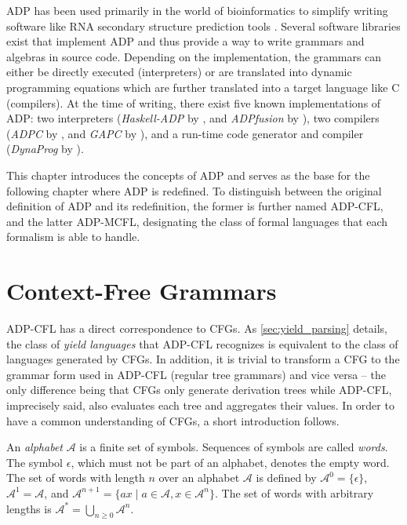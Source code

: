 \documentclass[
    a4paper,
    12pt,
    twoside,
    BCOR=12mm,
    parskip=half,
    chapterprefix,
    numbers=noenddot,
    bibliography=totoc
]{scrbook}
\begin{document}
\Gls{ADP} has been used primarily in the world of \gls{bioinformatics} to simplify writing software like \gls{RNA} secondary structure prediction tools \citep{reeder_design_2004,giegerich_abstract_2004,theis_prediction_2010}. Several software libraries exist that implement \gls{ADP} and thus provide a way to write grammars and algebras in source code. Depending on the implementation, the grammars can either be directly executed (interpreters) or are translated into dynamic programming equations which are further translated into a target language like C (compilers). At the time of writing, there exist five known implementations of \gls{ADP}: two interpreters (\emph{Haskell-ADP} by \citet{giegerich_discipline_2004}, and \emph{ADPfusion} by \citet{honer_zu_siederdissen_sneaking_2012}), two compilers (\emph{ADPC} by \citet{steffen_compiling_2006}, and \emph{GAPC} by \citet{sauthoff_bellmans_2011}), and a run-time code generator and compiler (\emph{DynaProg} by \citet{coppey_dynaprog_2012}).

This chapter introduces the concepts of \gls{ADP} and serves as the base for the following chapter where \gls{ADP} is redefined. To distinguish between the original definition of \gls{ADP} and its redefinition, the former is further named \gls{ADP-CFL}, and the latter \gls{ADP-MCFL}, designating the class of formal languages that each formalism is able to handle.

\section{Context-Free Grammars}
\label{sec:cfgs}

ADP-CFL has a direct correspondence to \glspl{CFG}. As \cref{sec:yield_parsing} details, the class of \emph{yield languages} that ADP-CFL recognizes is equivalent to the class of languages generated by \glspl{CFG}. In addition, it is trivial to transform a \gls{CFG} to the grammar form used in ADP-CFL (regular tree grammars) and vice versa -- the only difference being that \glspl{CFG} only generate derivation trees while ADP-CFL, imprecisely said, also evaluates each tree and aggregates their values. In order to have a common understanding of \glspl{CFG}, a short introduction follows.

\begin{definition}
  \label{def:alphabetwords}
	An \emph{alphabet} $\mathcal{A}$ is a finite set of symbols. Sequences of symbols are called \emph{words}. The symbol $\epsilon$, which must not be part of an alphabet, denotes the empty word.
	The set of words with length $n$ over an alphabet $\mathcal{A}$ is defined by $\mathcal{A}^0 = \{\epsilon\}$, $\mathcal{A}^1 = \mathcal{A}$, and $\mathcal{A}^{n+1} = \{ ax \mid a \in \mathcal{A}, x \in \mathcal{A}^n \}$. The set of words with arbitrary lengths is $\mathcal{A}^* = \bigcup_{n \geq 0} \mathcal{A}^n$.
\end{definition}
\end{document}
